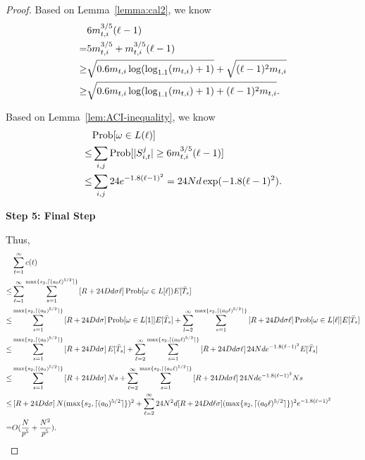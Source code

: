 \begin{proof}
Based on Lemma~\ref{lemma:cal2}, we know
\begin{align}
&6m_{t,i}^{3/5}(\ell-1) \nonumber \\
=& 5m_{t,i}^{3/5} + m_{t,i}^{3/5}(\ell-1) \nonumber \\
\geq & \sqrt{0.6m_{t,i}\log(\log_{1.1}(m_{t,i})+1)} + \sqrt{(\ell-1)^2 m_{t,i}} \nonumber \\
\geq & \sqrt{0.6m_{t,i}\log(\log_{1.1}(m_{t,i})+1)+(\ell-1)^2 m_{t,i}}. \nonumber
\end{align}

Based on Lemma~\ref{lem:ACI-inequality}, we know
\begin{align}
& \Prob{\omega\in L(\ell)} \nonumber \\
\leq &\sum_{i,j}\Prob{|S_{i,t}^{j}|\geq 6\NumPull{t}{i}^{3/5}(\ell-1)} \nonumber \\
\leq & \sum_{i,j}24e^{-1.8(\ell-1)^2} = 24\ARMNUM d\exp(-1.8(\ell-1)^2). \nonumber
\end{align}

\noindent\textbf{Step 5: Final Step}

Thus,
\begin{align}
&\sum_{t=1}^{\infty}c(t) \nonumber \\
\leq&\sum_{\ell=1}^{\infty}\sum_{s=1}^{\max\{s_2,\lceil (a_0 \ell)^{5/2} \rceil\}}\left[\MAXR+24\Diam d\sigma \ell\right]\Prob{\omega\in L[\ell])E[\bar{T}_{s}} \nonumber \\
\leq& \sum_{s=1}^{\max\{s_2,\lceil (a_0)^{5/2} \rceil\}}\left[\MAXR+24\Diam d\sigma \right]\Prob{\omega\in L[1]}E[\bar{T}_{s}] +\sum_{l=2}^{\infty}\sum_{s=1}^{\max\{s_2,\lceil (a_0 \ell)^{5/2} \rceil\}}\left[\MAXR+24\Diam d\sigma \ell\right]\Prob{\omega\in L[\ell]}E[\bar{T}_{s}] \nonumber \\
\leq& \sum_{s=1}^{\max\{s_2,\lceil (a_0)^{5/2} \rceil\}}\left[R+24\Diam d\sigma \right]E[\bar{T}_{s}] +\sum_{\ell=2}^{\infty}\sum_{s=1}^{\max\{s_2,\lceil (a_0 \ell)^{5/2} \rceil\}}\left[\MAXR+24\Diam d\sigma \ell\right]24\ARMNUM d e^{-1.8(\ell-1)^2}E[\bar{T}_{s}]\nonumber \\
\leq& \sum_{s=1}^{\max\{s_2,\lceil (a_0)^{5/2} \rceil\}}\left[\MAXR+24\Diam d\sigma \right]\ARMNUM s +\sum_{\ell=2}^{\infty}\sum_{s=1}^{\max\{s_2,\lceil (a_0 \ell)^{5/2} \rceil\}}\left[\MAXR+24\Diam d\sigma \ell\right]24 \ARMNUM d e^{-1.8(\ell-1)^2}\ARMNUM s \nonumber \\
\leq & \left[\MAXR+24\Diam d\sigma \right]\ARMNUM (\max\{s_2,\lceil (a_0)^{5/2} \rceil\})^2+\sum_{\ell=2}^{\infty}24\ARMNUM^2 d[\MAXR+24\Diam d\ell\sigma](\max\{s_2,\lceil (a_0 \ell)^{5/2} \rceil\})^2 e^{-1.8(\ell-1)^2} \nonumber \\
=& O(\frac{N}{\MinProb^5}+ \frac{\ARMNUM^2}{\MinProb^5}). \nonumber
\end{align}

\end{proof}

